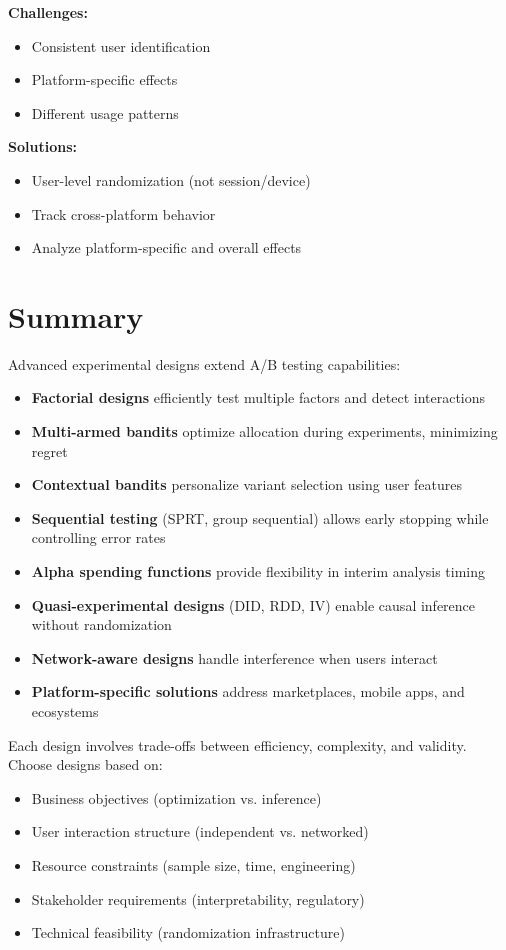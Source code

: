 \textbf{Challenges:}
\begin{itemize}
    \item Consistent user identification
    \item Platform-specific effects
    \item Different usage patterns
\end{itemize}

\textbf{Solutions:}
\begin{itemize}
    \item User-level randomization (not session/device)
    \item Track cross-platform behavior
    \item Analyze platform-specific and overall effects
\end{itemize}

\section{Summary}

Advanced experimental designs extend A/B testing capabilities:

\begin{itemize}
    \item \textbf{Factorial designs} efficiently test multiple factors and detect interactions
    \item \textbf{Multi-armed bandits} optimize allocation during experiments, minimizing regret
    \item \textbf{Contextual bandits} personalize variant selection using user features
    \item \textbf{Sequential testing} (SPRT, group sequential) allows early stopping while controlling error rates
    \item \textbf{Alpha spending functions} provide flexibility in interim analysis timing
    \item \textbf{Quasi-experimental designs} (DID, RDD, IV) enable causal inference without randomization
    \item \textbf{Network-aware designs} handle interference when users interact
    \item \textbf{Platform-specific solutions} address marketplaces, mobile apps, and ecosystems
\end{itemize}

Each design involves trade-offs between efficiency, complexity, and validity. Choose designs based on:
\begin{itemize}
    \item Business objectives (optimization vs. inference)
    \item User interaction structure (independent vs. networked)
    \item Resource constraints (sample size, time, engineering)
    \item Stakeholder requirements (interpretability, regulatory)
    \item Technical feasibility (randomization infrastructure)
\end{itemize}

